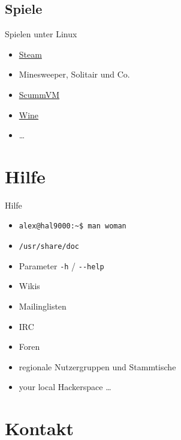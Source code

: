 \documentclass{beamer}
\begin{document}
\subsection{Spiele}

\begin{frame}{Spielen unter Linux}
    \begin{itemize}
        \item \href{https://store.steampowered.com/linux}{Steam}
        \item Minesweeper, Solitair und Co.
        \item \href{https://www.scummvm.org/}{ScummVM}
        \item \href{https://www.winehq.org/}{Wine}
        \item …
    \end{itemize}
\end{frame}

\section{Hilfe}

\frame{\tableofcontents[currentsection]}

\begin{frame}{Hilfe}
    \begin{itemize}
        \item \texttt{alex@hal9000:\textasciitilde\$ man woman}
        \item \texttt{/usr/share/doc}
        \item Parameter \texttt{-h} / \texttt{-{}-help}
        \item Wikis
        \item Mailinglisten
        \item IRC
        \item Foren
        \item regionale Nutzergruppen und Stammtische
        \item your local Hackerspace …
    \end{itemize}
\end{frame}

\section{Kontakt}
\end{document}
